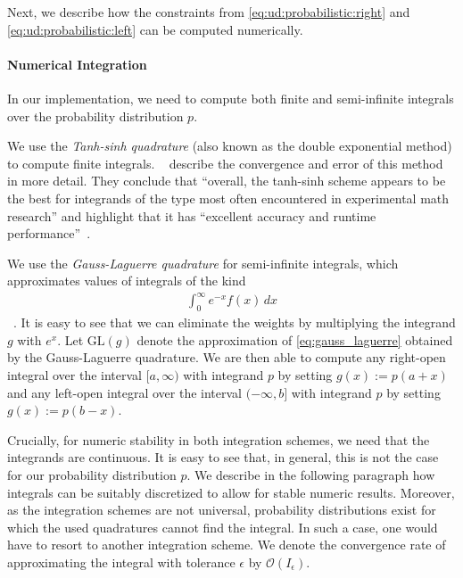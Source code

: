 Next, we describe how the constraints from \cref{eq:ud:probabilistic:right} and \cref{eq:ud:probabilistic:left} can be computed numerically.

\paragraph{Numerical Integration} In our implementation, we need to compute both finite and semi-infinite integrals over the probability distribution $p$.

We use the \emph{Tanh-sinh quadrature} (also known as the double exponential method) to compute finite integrals. \citeauthor*{Bailey2005}~\cite{Bailey2005} describe the convergence and error of this method in more detail. They conclude that ``overall, the tanh-sinh scheme appears to be the best
for integrands of the type most often encountered in experimental math research'' and highlight that it has ``excellent accuracy and runtime performance''~\cite{Bailey2005}.

We use the \emph{Gauss-Laguerre quadrature} for semi-infinite integrals, which approximates values of integrals of the kind \begin{align}\label{eq:gauss_laguerre}
    \int_0^{\infty} e^{-x} f(x) \,dx
\end{align}~\cite{Weisstein}. It is easy to see that we can eliminate the weights by multiplying the integrand $g$ with $e^x$. Let $\text{GL}(g)$ denote the approximation of \cref{eq:gauss_laguerre} obtained by the Gauss-Laguerre quadrature. We are then able to compute any right-open integral over the interval $[{a,\infty})$ with integrand $p$ by setting $g(x) := p(a+x)$ and any left-open integral over the interval $({-\infty,b}]$ with integrand $p$ by setting $g(x) := p(b-x)$.

Crucially, for numeric stability in both integration schemes, we need that the integrands are continuous. It is easy to see that, in general, this is not the case for our probability distribution $p$. We describe in the following paragraph how integrals can be suitably discretized to allow for stable numeric results. Moreover, as the integration schemes are not universal, probability distributions exist for which the used quadratures cannot find the integral. In such a case, one would have to resort to another integration scheme. We denote the convergence rate of approximating the integral with tolerance $\epsilon$ by $\mathcal{O}(I_{\epsilon})$.

